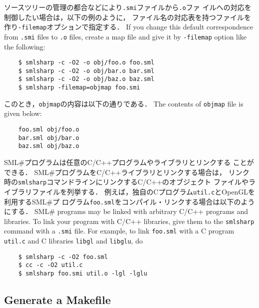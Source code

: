\documentclass{jbook}
\newcommand{\txt}[2]{#2}
\newcommand{\smlsharp}{SML\#}
\begin{document}
\ifjp%
	ソースツリーの管理の都合などにより{\tt .smi}ファイルから{\tt .o}ファ
イルへの対応を制御したい場合は，以下の例のように，
ファイル名の対応表を持つファイルを作り{\tt -filemap}オプションで指定する．
\else%
	If you change this default correspondence from {\tt .smi} files
to {\tt .o} files,
create a map file and give it by {\tt -filemap} option like the following:
\fi%
\begin{verbatim}
    $ smlsharp -c -O2 -o obj/foo.o foo.sml
    $ smlsharp -c -O2 -o obj/bar.o bar.sml
    $ smlsharp -c -O2 -o obj/baz.o baz.sml
    $ smlsharp -filemap=objmap foo.smi
\end{verbatim}
\ifjp%
	このとき，{\tt objmap}の内容は以下の通りである．
\else%
	The contents of {\tt objmap} file is given below:
\fi%
\begin{verbatim}
    foo.sml obj/foo.o
    bar.sml obj/bar.o
    baz.sml obj/baz.o
\end{verbatim}

\ifjp%
	\smlsharp{}プログラムは任意のC/C++プログラムやライブラリとリンクする
ことができる．
	\smlsharp{}プログラムをC/C++ライブラリとリンクする場合は，
リンク時の{\tt smlsharp}コマンドラインにリンクするC/C++のオブジェクト
ファイルやライブラリファイルを列挙する．
	例えば，独自のCプログラム{\tt util.c}とOpenGLを利用する\smlsharp{}プ
ログラム{\tt foo.sml}をコンパイル・リンクする場合は以下のようにする．
\else%
	\smlsharp{} programs may be linked with arbitrary C/C++ programs
and libraries.
	To link your program with C/C++ libraries, give them
to the {\tt smlsharp} command with a {\tt .smi} file.
	For example, to link {\tt foo.sml} with
a C program {\tt util.c} and
C libraries {\tt libgl} and {\tt libglu}, do
\fi%
\begin{verbatim}
    $ smlsharp -c -O2 foo.sml
    $ cc -c -O2 util.c
    $ smlsharp foo.smi util.o -lgl -lglu
\end{verbatim}

\subsection{\txt{Makefileの生成}{Generate a Makefile}}
\end{document}

